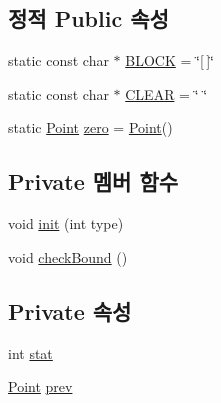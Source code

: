 \subsection*{정적 Public 속성}
\begin{DoxyCompactItemize}
\item 
static const char $\ast$ \hyperlink{class_block_a4cb64c2c20884eed68c24c6147f68514}{B\+L\+O\+CK} = \char`\"{}\mbox{[}$\,$\mbox{]}\char`\"{}
\item 
static const char $\ast$ \hyperlink{class_block_a11bcda9589b54be35a8905ca7be7310e}{C\+L\+E\+AR} = \char`\"{} \char`\"{}
\item 
static \hyperlink{struct_point}{Point} \hyperlink{class_block_ad456f4794a480711f7057e1f270d93c2}{zero} = \hyperlink{struct_point}{Point}()
\end{DoxyCompactItemize}
\subsection*{Private 멤버 함수}
\begin{DoxyCompactItemize}
\item 
void \hyperlink{class_block_a35d1fdd5ff24816037fff5b419aaabb8}{init} (int type)
\item 
void \hyperlink{class_block_a4ce6f20dfa2c216f77cbc1a7f2a6f3a2}{check\+Bound} ()
\end{DoxyCompactItemize}
\subsection*{Private 속성}
\begin{DoxyCompactItemize}
\item 
int \hyperlink{class_block_a786c39534d84f71238f0189d8852e432}{stat}
\item 
\hyperlink{struct_point}{Point} \hyperlink{class_block_ab86ce4753987a3eb39058553fd81b462}{prev}
\end{DoxyCompactItemize}
